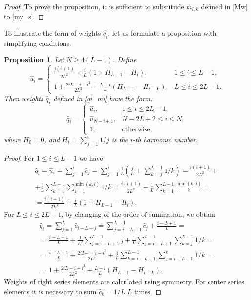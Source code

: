 \documentclass[sii]{ipart}
\newtheorem{proposition}{Proposition}
\begin{document}
\begin{proof}
	To prove the proposition, it is sufficient to substitude $m_{l,k}$ defined in \eqref{Mw} to \eqref{my_s}.
\end{proof}

To illustrate the form of weights $\hat{q_i}$, let us formulate a proposition with simplifying conditions.

\begin{proposition} \label{myserweightstat}
	Let $N \ge 4(L-1)$. Define
	\begin{equation*}
	\hat{u}_i = \begin{cases}
	\frac{i(i+1)}{2 L^2} + \frac{i}{L}(1 + H_{L-1} - H_i), &1 \le i \le L-1, \\
	1 + \frac{2iL-i-i^2}{2L^2} + \frac{L-i}{L}(H_{L-1} - H_{i - L}), & L \le i \le 2L-1.
	\end{cases}
	\end{equation*}
	 Then weights $\hat{q}_i$ defined in \eqref{qi_mi}
	have the form:
	\begin{equation*}
	\hat{q}_i = \begin{cases}
	\hat{u}_i, &1 \le i \le 2L-1, \\
	\hat{u}_{N-i+1}, &N-2L+2 \le i \le N, \\
	1, &\text{otherwise},
	\end{cases}
	\end{equation*}
	where $H_0 = 0$, and $H_i = \sum_{j=1}^i 1/j$ is the $i$-th harmonic number.
\end{proposition}

\begin{proof}
	For $1 \le i \le L-1$ we have
	\begin{multline*}
	\hat{q}_i = \hat{u}_i = \sum_{j=1}^i \hat{c}_j = \sum_{j=1}^i \frac{1}{L}\left(\frac{j}{L} + \sum_{k=j}^{L-1}1/k\right)\! =
	\frac{i(i+1)}{2L^2} + \\ + \frac{1}{L} \sum_{k = 1}^{L-1} \sum_{j=1}^{\min(k,i)} 1/k = \frac{i(i+1)}{2L^2}+\frac{1}{L} \sum_{k = 1}^{L-1} \frac{\min(k,i)}{k} = \\ = \frac{i(i+1)}{2 L^2} + \frac{i}{L}(1 + H_{L-1} - H_i).
	\end{multline*}
	For $L \le i \le 2L-1$, by changing of the order of summation, we obtain
	\begin{multline*}
	\hat{q}_i = \sum_{j = 1}^L \hat{c}_{i-L+j} = \sum_{j = i - L + 1}^{L - 1} \hat{c}_j + \frac{i - L + 1}{L} =\\
	=\frac{i - L + 1}{L} + \frac{1}{L^2} \sum_{j = i - L + 1}^{L-1}j + \frac{1}{L} \sum_{j = i-L + 1}^{L-1} \sum_{k=j}^{L-1}1/k =\\
	=\frac{i - L + 1}{L} + \frac{2iL - =i - i^2}{2L^2} + \frac{1}{L} \sum_{k = i - L + 1}^{L - 1} \sum_{j = i - L + 1}^k 1/k =\\
	=1 + \frac{2iL-i-i^2}{2L^2} + \frac{L-i}{L}(H_{L-1} - H_{i - L}).
	\end{multline*}
	Weights of right series elements are calculated using symmetry. For center series elements it is necessary to sum $\hat{c}_k = 1/L$ $L$ times.
\end{proof}
\end{document}
